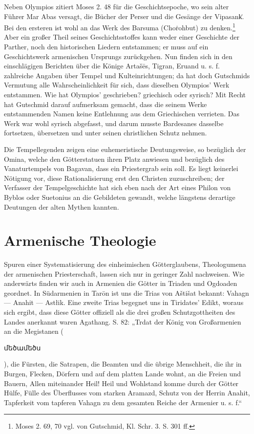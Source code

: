 \documentclass{article}
\begin{document}
Neben Olympios zitiert Moses 2. 48 für die Geschichtsepoche, wo sein alter Führer Mar Abas versagt, die Bücher der Perser und die Gesänge der Vipasank͑. Bei den ersteren ist wohl an das Werk des Barsuma (Choṙohbut) zu denken.\footnote{Moses 2. 69, 70 vgl. von Gutschmid, Kl. Schr. 3. S. 301 ff.} Aber ein großer Theil seines Geschichtsstoffes kann weder einer Geschichte der Parther, noch den historischen Liedern entstammen; er muss auf ein Geschichtswerk armenischen Ursprungs zurückgehen. Nun finden sich in den einschlägigen Berichten über die Könige Artašēs, Tigran, Eruand u. s. f. zahlreiche Angaben über Tempel und Kulteinrichtungen; da hat doch Gutschmids Vermutung alle Wahrscheinlichkeit für sich, dass dieselben Olympios' Werk entstammen. Wie hat Olympios' geschrieben? griechisch oder syrisch? Mit Recht hat Gutschmid darauf aufmerksam gemacht, dass die seinem Werke entstammenden Namen keine Entlehnung aus dem Griechischen verrieten. Das Werk war wohl syrisch abgefasst, und darum musste Bardesanes dasselbe fortsetzen, übersetzen und unter seinen christlichen Schutz nehmen.

Die Tempellegenden zeigen eine euhemeristische Deutungsweise, so bezüglich der Omina, welche den Götterstatuen ihren Platz anwiesen und bezüglich des Vanaturtempels von Bagavan, dass ein Priestergrab sein soll. Es liegt keinerlei Nötigung vor, diese Rationalisierung erst den Christen zuzuschreiben; der Verfasser der Tempelgeschichte hat sich eben nach der Art eines Philon von Byblos oder Suetonius an die Gebildeten gewandt, welche längstens derartige Deutungen der alten Mythen kannten.
\clearpage
\section{Armenische Theologie}
\paragraph{}
Spuren einer Systematisierung des einheimischen Götterglaubens, Theologumena der armenischen Priesterschaft, lassen sich nur in geringer Zahl nachweisen. Wie anderwärts finden wir auch in Armenien die Götter in Triaden und Ogdoaden geordnet. In Südarmenien in Tarōn ist uns die Trias von Aštišat bekannt: Vahagn — Anahit — Astłik. Eine zweite Trias begegnet uns in Tiridates' Edikt, woraus sich ergibt, dass diese Götter offiziell als die drei großen Schutzgottheiten des Landes anerkannt waren Agathang. S. 82: „Trdat der König von Großarmenien an die Megistanen (\begin{armenian}մեծամեծս\end{armenian}), die Fürsten, die Satrapen, die Beamten und die übrige Menschheit, die ihr in Burgen, Flecken, Dörfern und auf dem platten Lande wohnt, an die Freien und Bauern, Allen miteinander Heil! Heil und Wohlstand komme durch der Götter Hülfe, Fülle des Überflusses vom starken Aramazd, Schutz von der Herrin Anahit, Tapferkeit vom tapferen Vahagn zu dem gesamten Reiche der Armenier u. s. f.“
\end{document}
